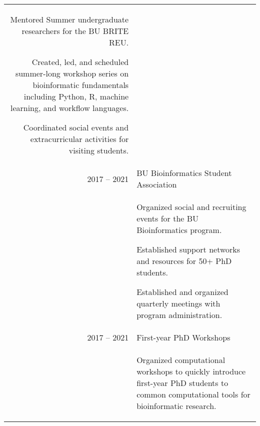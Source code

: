 \documentclass[a4paper,10pt]{report}
\begin{document}
\begin{longtable}{rp{11.5cm}}
\begin{itemize}
		   \vspace{-3.5mm}
		   \small{
		   \item Mentored Summer undergraduate researchers for the
		         BU BRITE REU.
		   \item Created, led, and scheduled summer-long workshop series on bioinformatic fundamentals including Python, R, machine learning, and workflow languages.
		   \item  Coordinated social events and extracurricular activities for visiting students.}
		         \vspace{-3.5mm}
	   \end{itemize}
	\\[-1em]
	2017 -- 2021
	 & BU Bioinformatics Student Association                                                                                                                                       \\[0.225em]
	 & \begin{itemize}
		   \vspace{-3.5mm}
		   \small{
		   \item Organized social and recruiting events for the BU
		         Bioinformatics program.
		   \item Established
		         support networks and resources for 50+ PhD students.
		   \item Established and organized quarterly meetings with program administration.
		         }
		         \vspace{-3.5mm}
	   \end{itemize}                                                                                              \\[-1em]
	2017 -- 2021
	 & First-year PhD Workshops                                                                                                                                                    \\[0.2em]                                                                                                                                                                            & \begin{itemize}
		\vspace{-3.5mm}
		\small{
		\item Organized computational workshops to quickly
		      introduce first-year PhD students to common computational tools for bioinformatic research.
		      }
		      \vspace{-3.5mm}
	\end{itemize}

\end{longtable}
\end{document}
